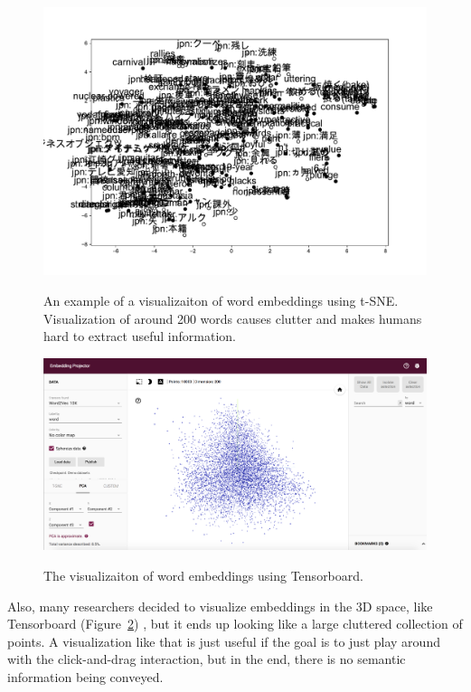 \begin{figure}[htb]
 \centering
     {\includegraphics[width=0.78\linewidth]{figures/t_sne_en_jp_cluttered.pdf}}
    \vspace{-1ex}
     \caption{An example of a visualizaiton of word embeddings using t-SNE. Visualization of around 200 words causes clutter and makes humans hard to extract useful information. }
\label{fig:t_sne}
\end{figure}


\begin{figure}[htb]
 \centering
     {\includegraphics[width=0.78\linewidth]{figures/tensorboard.png}}
    \vspace{-1ex}
     \caption{The visualizaiton of word embeddings using Tensorboard.}
\label{fig:tensorboard}
\end{figure}



Also, many researchers decided to visualize embeddings in the 3D space, like Tensorboard (Figure~\ref{fig:tensorboard}) \cite{tensorboard_viz}, but it ends up looking like a large cluttered collection of points. A visualization like that is just useful if the goal is to just play around with the click-and-drag interaction, but in the end, there is no semantic information being conveyed. \\


